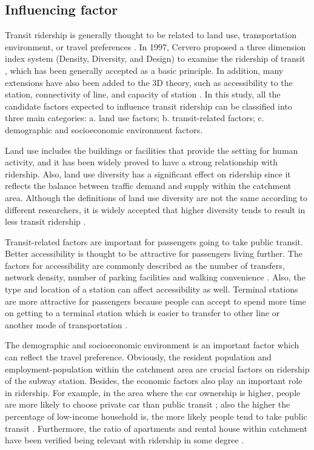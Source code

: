 \subsection{Influencing factor}
Transit ridership is generally thought to be related to land use, transportation environment, or travel preferences \cite{thompson1997achieving}. In 1997, Cervero proposed a three dimension index system (Density, Diversity, and Design) to examine the ridership of transit \cite{cervero1997travel}, which has been generally accepted as a basic principle. In addition, many extensions have also been added to the 3D theory, such as accessibility to the station, connectivity of line, and capacity of station \cite{beimborn2003accessibility,garcia2013walking}. In this study, all the candidate factors expected to influence transit ridership can be classified into three main categories: a. land use factors; b. transit-related factors; c. demographic and socioeconomic environment factors.

Land use includes the buildings or facilities that provide the setting for human activity, and it has been widely proved to have a strong relationship with ridership. Also, land use diversity has a significant effect on ridership since it reflects the balance between traffic demand and supply within the catchment area. Although the definitions of land use diversity are not the same according to different researchers, it is widely accepted that higher diversity tends to result in less transit ridership \cite{cardozo2012application,choi2012analysis,gutierrez2011transit,jun2015land,sohn2010factors,sung2014exploring}.

Transit-related factors are important for passengers going to take public transit. Better accessibility is thought to be attractive for passengers living further. The factors for accessibility are commonly described as the number of transfers, network density, number of parking facilities and walking convenience \cite{kuby2004factors,sohn2010factors,taylor2009nature,zhao2014analysis,chu2004ridership}. Also, the type and location of a station can affect accessibility as well. Terminal stations are more attractive for passengers because people can accept to spend more time on getting to a terminal station which is easier to transfer to other line or another mode of transportation \cite{o1996walking}.

The demographic and socioeconomic environment is an important factor which can reflect the travel preference. Obviously, the resident population and employment-population within the catchment area are crucial factors on ridership of the subway station. Besides, the economic factors also play an important role in ridership. For example, in the area where the car ownership is higher, people are more likely to choose private car than public transit \cite{chiou2015factors,zhao2005transit}; also the higher the percentage of low-income household is, the more likely people tend to take public transit \cite{thompson2012really}. Furthermore, the ratio of apartments and rental house within catchment have been verified being relevant with ridership in some degree \cite{jun2015land}.

